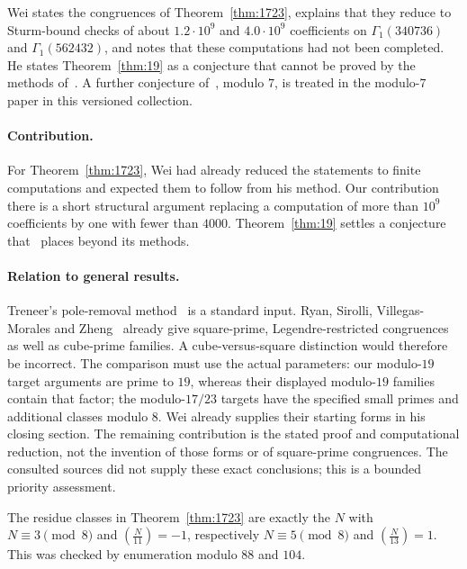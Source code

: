 \documentclass[11pt]{article}
\theoremstyle{remark}\newtheorem{remark}[theorem]{Remark}
\newcommand{\leg}[2]{\left(\frac{#1}{#2}\right)}
\begin{document}
Wei states the congruences of Theorem~\ref{thm:1723}, explains that they reduce to Sturm-bound checks of about $1.2\cdot10^9$ and $4.0\cdot10^9$ coefficients on $\Gamma_1(340736)$ and $\Gamma_1(562432)$, and notes that these computations had not been completed. He states Theorem~\ref{thm:19} as a conjecture that cannot be proved by the methods of~\cite{Wei}. A further conjecture of~\cite{Wei}, modulo $7$, is treated in the modulo-$7$ paper in this versioned collection.

\paragraph{Contribution.} For Theorem~\ref{thm:1723}, Wei had already reduced the statements to finite computations and expected them to follow from his method. Our contribution there is a short structural argument replacing a computation of more than $10^9$ coefficients by one with fewer than $4000$. Theorem~\ref{thm:19} settles a conjecture that~\cite{Wei} places beyond its methods.

\paragraph{Relation to general results.} Treneer's pole-removal method~\cite{Treneer} is a standard input. Ryan, Sirolli, Villegas-Morales and Zheng~\cite[Theorems 1.3 and 1.5]{RSVZ} already give square-prime, Legendre-restricted congruences as well as cube-prime families. A cube-versus-square distinction would therefore be incorrect. The comparison must use the actual parameters: our modulo-$19$ target arguments are prime to $19$, whereas their displayed modulo-$19$ families contain that factor; the modulo-$17/23$ targets have the specified small primes and additional classes modulo $8$. Wei already supplies their starting forms in his closing section. The remaining contribution is the stated proof and computational reduction, not the invention of those forms or of square-prime congruences. The consulted sources did not supply these exact conclusions; this is a bounded priority assessment.

The residue classes in Theorem~\ref{thm:1723} are exactly the $N$ with $N\equiv3\pmod 8$ and $\leg N{11}=-1$, respectively $N\equiv5\pmod8$ and $\leg N{13}=1$. This was checked by enumeration modulo $88$ and $104$.
\end{document}

